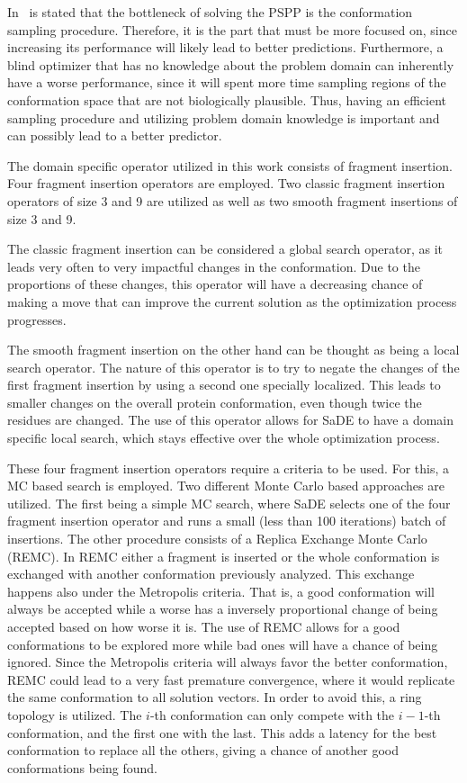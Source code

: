 In~\cite{kim2009sampling} is stated that the bottleneck of solving the
\ac{PSPP} is the conformation sampling procedure. Therefore, it is the part
that must be more focused on, since increasing its performance will likely lead
to better predictions. Furthermore, a blind optimizer that has no knowledge
about the problem domain can inherently have a worse performance, since it will
spent more time sampling regions of the conformation space that are not
biologically plausible. Thus, having an efficient sampling procedure and
utilizing problem domain knowledge is important and can possibly lead to a
better predictor.

The domain specific operator utilized in this work consists of
fragment insertion. Four fragment insertion operators are employed.
Two classic fragment insertion operators of size 3 and 9 are utilized
as well as two smooth fragment insertions of size 3 and 9.

The classic fragment insertion can be considered a global search
operator, as it leads very often to very impactful changes
in the conformation. Due to the proportions of these changes,
this operator will have a decreasing chance of making a move
that can improve the current solution as the optimization process
progresses.

The smooth fragment insertion on the other hand can be thought as
being a local search operator. The nature of this operator
is to try to negate the changes of the first fragment insertion by using
a second one specially localized. This leads to smaller changes on the
overall protein conformation, even though twice the residues are changed.
The use of this operator allows for \ac{SaDE} to have a domain specific local
search, which stays effective over the whole optimization process.

These four fragment insertion operators require a criteria to be used. For
this, a \ac{MC} based search is employed. Two different Monte Carlo based
approaches are utilized. The first being a simple \ac{MC} search, where
\ac{SaDE} selects one of the four fragment insertion operator and runs a small
(less than 100 iterations) batch of insertions. The other procedure consists of
a Replica Exchange Monte Carlo (REMC). In \ac{REMC} either a fragment is
inserted or the whole conformation is exchanged with another conformation
previously analyzed. This exchange happens also under the Metropolis criteria.
That is, a good conformation will always be accepted while a worse has a
inversely proportional change of being accepted based on how worse it is.  The
use of \ac{REMC} allows for a good conformations to be explored more while bad
ones will have a chance of being ignored. Since the Metropolis criteria will
always favor the better conformation, \ac{REMC} could lead to a very fast
premature convergence, where it would replicate the same conformation to all
solution vectors.  In order to avoid this, a ring topology is utilized. The
$i$-th conformation can only compete with the $i-1$-th conformation, and the
first one with the last. This adds a latency for the best conformation to
replace all the others, giving a chance of another good conformations being
found.

